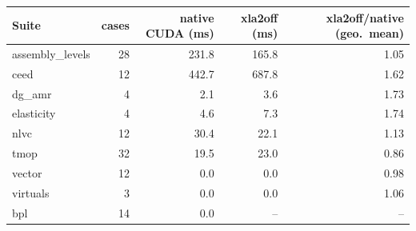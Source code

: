 \begin{tabular}{l r r r r}
\toprule
Suite & cases & native CUDA (ms) & xla2off (ms) & xla2off/native (geo.\ mean) \\
\midrule
assembly_levels & 28 & 231.8 & 165.8 & 1.05 \\
ceed & 12 & 442.7 & 687.8 & 1.62 \\
dg_amr & 4 & 2.1 & 3.6 & 1.73 \\
elasticity & 4 & 4.6 & 7.3 & 1.74 \\
nlvc & 12 & 30.4 & 22.1 & 1.13 \\
tmop & 32 & 19.5 & 23.0 & 0.86 \\
vector & 12 & 0.0 & 0.0 & 0.98 \\
virtuals & 3 & 0.0 & 0.0 & 1.06 \\
bpl & 14 & 0.0 & -- & -- \\
\bottomrule
\end{tabular}
